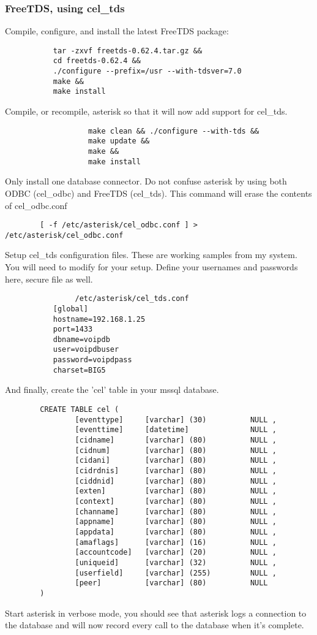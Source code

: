 \subsubsection{FreeTDS, using cel\_tds}
		Compile, configure, and install the latest FreeTDS package:
\begin{verbatim}
		   tar -zxvf freetds-0.62.4.tar.gz &&
		   cd freetds-0.62.4 &&
		   ./configure --prefix=/usr --with-tdsver=7.0
		   make &&
		   make install
\end{verbatim}
                Compile, or recompile, asterisk so that it will now add support
                for cel\_tds.
\begin{verbatim}
                   make clean && ./configure --with-tds &&
                   make update &&
                   make &&
                   make install
\end{verbatim}
                Only install one database connector.  Do not confuse asterisk
                by using both ODBC (cel\_odbc) and FreeTDS (cel\_tds).
                This command will erase the contents of cel\_odbc.conf
\begin{verbatim}
		[ -f /etc/asterisk/cel_odbc.conf ] > /etc/asterisk/cel_odbc.conf
\end{verbatim}
                Setup cel\_tds configuration files.  These are working samples
                from my system.  You will need to modify for your setup. Define
                your usernames and passwords here, secure file as well.
\begin{verbatim}
                /etc/asterisk/cel_tds.conf
		   [global]
		   hostname=192.168.1.25
		   port=1433
		   dbname=voipdb
		   user=voipdbuser
		   password=voipdpass
		   charset=BIG5
\end{verbatim}
                And finally, create the 'cel' table in your mssql database.
\begin{verbatim}
		CREATE TABLE cel (
				[eventtype]     [varchar] (30)          NULL ,
		        [eventtime]     [datetime]              NULL ,
		        [cidname]       [varchar] (80)          NULL ,
		        [cidnum]        [varchar] (80)          NULL ,
		        [cidani]        [varchar] (80)          NULL ,
		        [cidrdnis]      [varchar] (80)          NULL ,
		        [ciddnid]       [varchar] (80)          NULL ,
		        [exten]         [varchar] (80)          NULL ,
		        [context]       [varchar] (80)          NULL ,
		        [channame]      [varchar] (80)          NULL ,
		        [appname]       [varchar] (80)          NULL ,
		        [appdata]       [varchar] (80)          NULL ,
		        [amaflags]      [varchar] (16)          NULL ,
		        [accountcode]   [varchar] (20)          NULL ,
		        [uniqueid]      [varchar] (32)          NULL ,
		        [userfield]     [varchar] (255)         NULL ,
		        [peer]          [varchar] (80)          NULL
		)
\end{verbatim}
                Start asterisk in verbose mode, you should see that asterisk
                logs a connection to the database and will now record every
                call to the database when it's complete.


